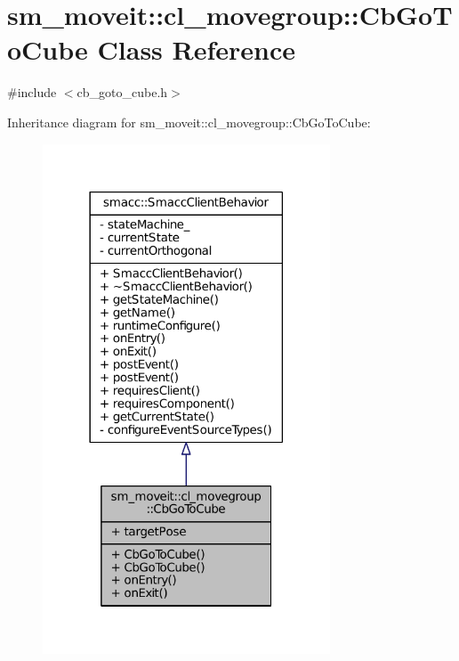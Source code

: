 \hypertarget{classsm__moveit_1_1cl__movegroup_1_1CbGoToCube}{}\section{sm\+\_\+moveit\+:\+:cl\+\_\+movegroup\+:\+:Cb\+Go\+To\+Cube Class Reference}
\label{classsm__moveit_1_1cl__movegroup_1_1CbGoToCube}


{\ttfamily \#include $<$cb\+\_\+goto\+\_\+cube.\+h$>$}



Inheritance diagram for sm\+\_\+moveit\+:\+:cl\+\_\+movegroup\+:\+:Cb\+Go\+To\+Cube\+:
\nopagebreak
\begin{figure}[H]
\begin{center}
\leavevmode
\includegraphics[width=242pt]{classsm__moveit_1_1cl__movegroup_1_1CbGoToCube__inherit__graph}
\end{center}
\end{figure}


